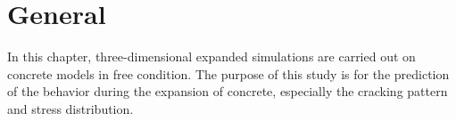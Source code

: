 


\section{General}

In this chapter, three-dimensional expanded simulations are carried out on concrete models in free condition. The purpose of this study is for the prediction of the behavior during the expansion of concrete, especially the cracking pattern and stress distribution.

